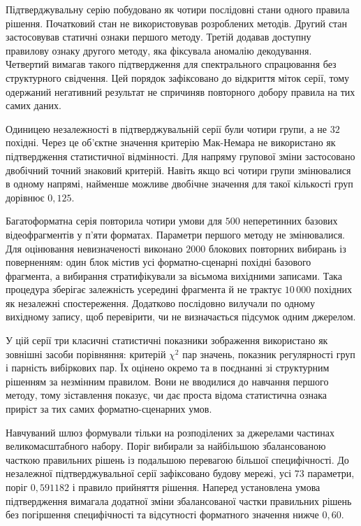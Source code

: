 Підтверджувальну серію побудовано як чотири послідовні стани одного правила рішення. Початковий стан не використовував розроблених методів. Другий стан застосовував статичні ознаки першого методу. Третій додавав доступну правилову ознаку другого методу, яка фіксувала аномалію декодування. Четвертий вимагав такого підтвердження для спектрального спрацювання без структурного свідчення. Цей порядок зафіксовано до відкриття міток серії, тому одержаний негативний результат не спричиняв повторного добору правила на тих самих даних.

Одиницею незалежності в підтверджувальній серії були чотири групи, а не $32$ похідні. Через це об’єктне значення критерію Мак-Немара не використано як підтвердження статистичної відмінності. Для напряму групової зміни застосовано двобічний точний знаковий критерій. Навіть якщо всі чотири групи змінювалися в одному напрямі, найменше можливе двобічне значення для такої кількості груп дорівнює $0{,}125$.

Багатоформатна серія повторила чотири умови для $500$ неперетинних базових відеофрагментів у п’яти форматах. Параметри першого методу не змінювалися. Для оцінювання невизначеності виконано $2000$ блокових повторних вибирань із поверненням: один блок містив усі форматно-сценарні похідні базового фрагмента, а вибирання стратифікували за вісьмома вихідними записами. Така процедура зберігає залежність усередині фрагмента й не трактує $10\,000$ похідних як незалежні спостереження. Додатково послідовно вилучали по одному вихідному запису, щоб перевірити, чи не визначається підсумок одним джерелом.

У цій серії три класичні статистичні показники зображення використано як зовнішні засоби порівняння: критерій $\chi^2$ пар значень, показник регулярності груп і парність вибіркових пар. Їх оцінено окремо та в поєднанні зі структурним рішенням за незмінним правилом. Вони не вводилися до навчання першого методу, тому зіставлення показує, чи дає проста відома статистична ознака приріст за тих самих форматно-сценарних умов.

Навчуваний шлюз формували тільки на розподілених за джерелами частинах великомасштабного набору. Поріг вибирали за найбільшою збалансованою часткою правильних рішень із подальшою перевагою більшої специфічності. До незалежної підтверджувальної серії зафіксовано будову мережі, усі $73$ параметри, поріг $0{,}591182$ і правило прийняття рішення. Наперед установлена умова підтвердження вимагала додатної зміни збалансованої частки правильних рішень без погіршення специфічності та відсутності форматного значення нижче $0{,}60$.

